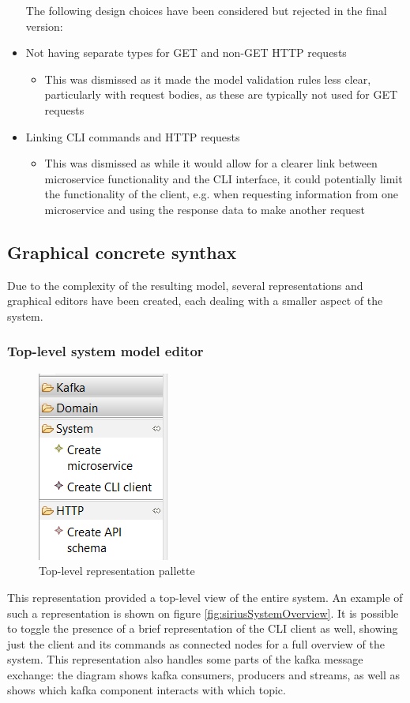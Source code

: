 \documentclass[parskip=full]{article}
\begin{document}
\begin{itemize}
        The following design choices have been considered but rejected in the final version:
        \item	Not having separate types for GET and non-GET HTTP requests
        \begin{itemize}
            \item This was dismissed as it made the model validation rules less clear, particularly with request bodies, as these are typically not used for GET requests
        \end{itemize}
        \item	Linking CLI commands and HTTP requests
        \begin{itemize}
            \item This was dismissed as while it would allow for a clearer link between microservice functionality and the CLI interface, it could potentially limit the functionality of the client, e.g. when requesting information from one microservice and using the response data to make another request
        \end{itemize}
    \end{itemize}
    \pagebreak
    \subsection{Graphical concrete synthax}
    Due to the complexity of the resulting model, several representations and graphical editors have been created, each dealing with a smaller aspect of the system.
    \subsubsection{Top-level system model editor}
    \begin{figure}
        \hspace{3em}
        \includegraphics[height=0.1\paperheight]{high-level-overview-pallette}
        \caption{Top-level representation pallette}
        \label{fig:topLevelPallette}
    \end{figure}
    This representation provided a top-level view of the entire system.
    An example of such a representation is shown on figure \ref{fig:siriusSystemOverview}.
    It is possible to toggle the presence of a brief representation of the CLI client as well, showing just the client and its commands as connected nodes for a full overview of the system.
    This representation also handles some parts of the kafka message exchange: the diagram shows kafka consumers, producers and streams, as well as shows which kafka component interacts with which topic.
\end{document}
